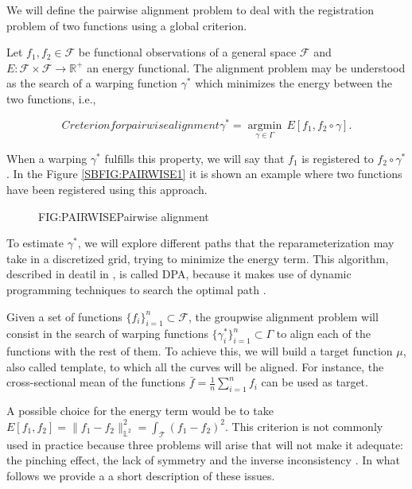 
We will define the pairwise alignment problem \cite{Srivastava2016} to deal with
the registration problem of two functions using a global criterion.

Let $f_1, f_2 \in \mathcal{F}$ be functional observations of a general space
$\mathcal{F}$ and $E: \mathcal{F} \times \mathcal{F} \rightarrow \mathbb{R}^+$ an energy
functional. The alignment problem may be understood as the search of a warping
function $\gamma^*$ which minimizes the energy between the two functions, i.e.,

\begin{equation}[EQ:ENERGY]{Creterion for pairwise alignment}
\gamma^* = \underset{\gamma \in \Gamma}{ \operatorname{argmin}} \, E[f_1, f_2 \circ \gamma].
\end{equation}

When a warping $\gamma^*$ fulfills this property, we will say that $f_1$ is
registered to $f_2 \circ \gamma^*$. In the Figure \ref{SBFIG:PAIRWISE1} it is
shown an example where two functions have been registered using this approach.

\begin{figure}[Pairwise alignment]{FIG:PAIRWISE}{Pairwise alignment}
	 \quad
\end{figure}

To estimate $\gamma^*$, we will explore different paths that the
reparameterization may take in a discretized grid, trying to minimize the energy
term. This algorithm, described in deatil in \cite{Srivastava2016}, is called \ac{DPA},
because it makes use of dynamic programming techniques to search the optimal
path \cite{dpa}.

Given a set of functions $\{f_i\}_{i=1}^n \subset \mathcal{F}$, the
groupwise alignment problem will consist in the search of warping functions
$\{\gamma_i^* \}_{i=1}^n \subset \Gamma$ to align each of the functions with the
rest of them. To achieve this, we will build a target function $\mu$, also
called template, to which all the curves will be aligned. For instance,
the cross-sectional mean of the functions $\bar f = \frac{1}{n}\sum_{i=1}^{n}f_i$
can be used as target.

A possible choice for the energy term would be to take
$E[f_1,f_2]= \|f_1 - f_2\|_{\mathbb{L}^2}^2=\int_\mathcal{T} (f_1 - f_2)^2$.
This criterion is not commonly used in practice because three
problems will arise that will not make it adequate: the pinching effect, the
lack of symmetry and the inverse inconsistency \cite{Marron2015}.
In what follows we provide a a short description of these issues.
